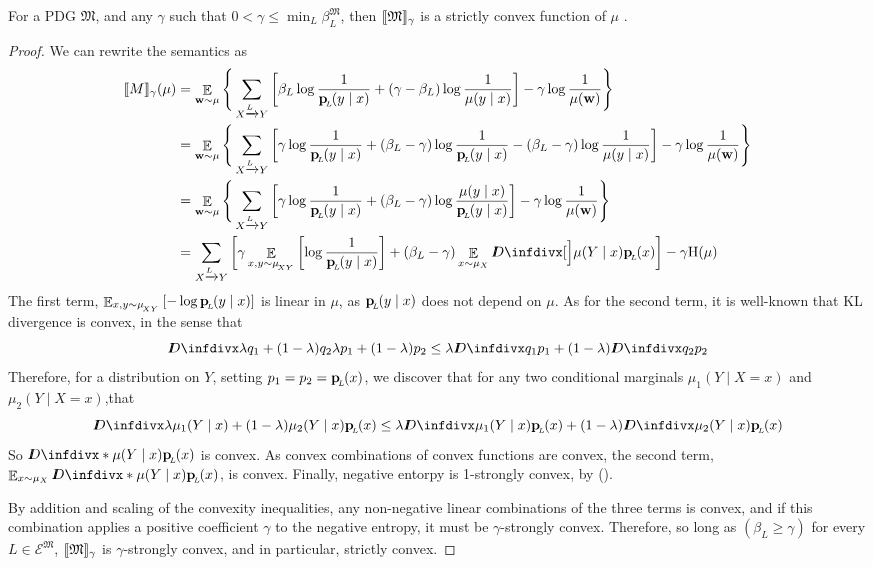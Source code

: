 \documentclass{article}
\newcommand{\dg}[1]{\mathfrak{#1}}
\newcommand{\bp}[1][L]{\mat{p}_{\!_{#1}\!}}
\newcommand{\Ed}{\mathcal E}
\begin{document}
    \begin{prop} \label{prop:convex-if-gamma-small}
        For a PDG $\dg M$, and any $\gamma$ such that $0 < \gamma \leq \min_L \beta_L^{\dg M}$, then $\bbr{\dg M}_\gamma$ is a strictly convex function of $\mu$ .%
    \end{prop}
    \begin{proof}
        We can rewrite the semantics as
        \begin{align*}
            \bbr{M}_\gamma(\mu) 
                &= \E_{\mat w \sim \mu} \Bigg\{   \sum_{ X \xrightarrow{\!\!L} Y  } \left[
        			\beta_L \log \frac{1}{\bp(y\mid x)} + (\gamma - \beta_L ) \log \frac{1}{\mu(y \mid x)} \right] - \gamma \log \frac{1}{\mu(\mat w)} \Bigg\} \\
                &= \E_{\mat w \sim \mu} \Bigg\{   \sum_{ X \xrightarrow{\!\!L} Y  } \left[ \gamma \log \frac{1}{\bp(y\mid x)} + 
                    (\beta_L - \gamma) \log \frac{1}{\bp(y\mid x)} - (\beta_L -\gamma) \log \frac{1}{\mu(y \mid x)} \right] - \gamma \log \frac{1}{\mu(\mat w)} \Bigg\}  \\
                &= \E_{\mat w \sim \mu} \Bigg\{   \sum_{ X \xrightarrow{\!\!L} Y  } \left[ \gamma \log \frac{1}{\bp(y\mid x)} + 
                    (\beta_L - \gamma) \log \frac{\mu(y\mid x)}{\bp(y\mid x)} \right] - \gamma \log \frac{1}{\mu(\mat w)} \Bigg\} \\
                &=  \sum_{ X \xrightarrow{\!\!L} Y  } \left[ \gamma \E_{x,y \sim \mu_{\!_{XY}}} \left[\log \frac{1}{\bp(y\mid x)} \right] + 
                    (\beta_L - \gamma) \E_{x\sim\mu_X} \kldiv[\Big]{\mu(Y\mid x)}{\bp( x)} \right] - \gamma \H(\mu)
        \end{align*}
        The first term, 
        \( \E_{x,y \sim \mu_{\!_{XY}}} \left[-\log {\bp(y\mid x)}\right] \) 
        is linear in $\mu$, as $\bp(y\mid x)$ does not depend on $\mu$. As for the second term, it is well-known that KL divergence is convex, in the sense that 
        \[ \kldiv{\lambda q_1 + (1-\lambda) q_2 }{ \lambda p_1 + (1-\lambda) p_2} \leq \lambda \kldiv {q_1}{ p_1} + (1-\lambda) \kldiv{q_2}{p_2} \]
        Therefore, for a distribution on $Y$, setting $p_1 = p_2 = \bp(x)$, we discover that for any two conditional marginals $\mu_1(Y \mid X=x)$ and $\mu_2(Y\mid X=x)$,that
        \[ \kldiv{\lambda \mu_1(Y\mid x) + (1-\lambda) \mu_2(Y\mid x) }{ \bp(x) } \leq \lambda \kldiv {\mu_1(Y\mid x)}{\bp(x)} + (1-\lambda) \kldiv{\mu_2(Y\mid x)}{\bp(x)} \]
        So $\kldiv*{\mu(Y\mid x)}{\bp( x)}$ is convex. As convex combinations of convex functions are convex, the second term, $\E_{x\sim\mu_X}\kldiv*{\mu(Y\mid x)}{\bp( x)}$, is convex.        Finally, negative entorpy is 1-strongly convex, by ().
    
        By addition and scaling of the convexity inequalities, any non-negative linear combinations of the three terms is convex, and if this combination applies a positive coefficient $\gamma$ to the negative entropy, it must be $\gamma$-strongly convex. Therefore, so long as $(\beta_L \geq \gamma)$ for every $L \in \Ed^{\dg M}$, $\bbr{\dg M}_\gamma$ is $\gamma$-strongly convex, and in particular, strictly convex.
    \end{proof}
    
\end{document}
